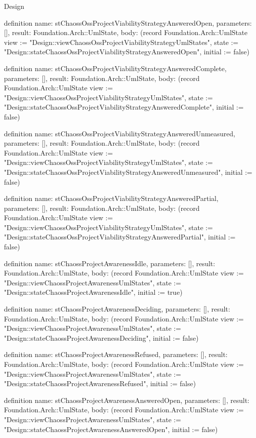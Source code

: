 \begin{lexlean}{Design}
\begin{semanticmodule}
definition{
  name: stChaossOssProjectViabilityStrategyAnsweredOpen,
  parameters: [],
  result: Foundation.Arch::UmlState,
  body: (record Foundation.Arch::UmlState {view := "Design::viewChaossOssProjectViabilityStrategyUmlStates", state := "Design::stateChaossOssProjectViabilityStrategyAnsweredOpen", initial := false})
}

definition{
  name: stChaossOssProjectViabilityStrategyAnsweredComplete,
  parameters: [],
  result: Foundation.Arch::UmlState,
  body: (record Foundation.Arch::UmlState {view := "Design::viewChaossOssProjectViabilityStrategyUmlStates", state := "Design::stateChaossOssProjectViabilityStrategyAnsweredComplete", initial := false})
}

definition{
  name: stChaossOssProjectViabilityStrategyAnsweredUnmeasured,
  parameters: [],
  result: Foundation.Arch::UmlState,
  body: (record Foundation.Arch::UmlState {view := "Design::viewChaossOssProjectViabilityStrategyUmlStates", state := "Design::stateChaossOssProjectViabilityStrategyAnsweredUnmeasured", initial := false})
}

definition{
  name: stChaossOssProjectViabilityStrategyAnsweredPartial,
  parameters: [],
  result: Foundation.Arch::UmlState,
  body: (record Foundation.Arch::UmlState {view := "Design::viewChaossOssProjectViabilityStrategyUmlStates", state := "Design::stateChaossOssProjectViabilityStrategyAnsweredPartial", initial := false})
}

definition{
  name: stChaossProjectAwarenessIdle,
  parameters: [],
  result: Foundation.Arch::UmlState,
  body: (record Foundation.Arch::UmlState {view := "Design::viewChaossProjectAwarenessUmlStates", state := "Design::stateChaossProjectAwarenessIdle", initial := true})
}

definition{
  name: stChaossProjectAwarenessDeciding,
  parameters: [],
  result: Foundation.Arch::UmlState,
  body: (record Foundation.Arch::UmlState {view := "Design::viewChaossProjectAwarenessUmlStates", state := "Design::stateChaossProjectAwarenessDeciding", initial := false})
}

definition{
  name: stChaossProjectAwarenessRefused,
  parameters: [],
  result: Foundation.Arch::UmlState,
  body: (record Foundation.Arch::UmlState {view := "Design::viewChaossProjectAwarenessUmlStates", state := "Design::stateChaossProjectAwarenessRefused", initial := false})
}

definition{
  name: stChaossProjectAwarenessAnsweredOpen,
  parameters: [],
  result: Foundation.Arch::UmlState,
  body: (record Foundation.Arch::UmlState {view := "Design::viewChaossProjectAwarenessUmlStates", state := "Design::stateChaossProjectAwarenessAnsweredOpen", initial := false})
}


\end{semanticmodule}
\end{lexlean}
